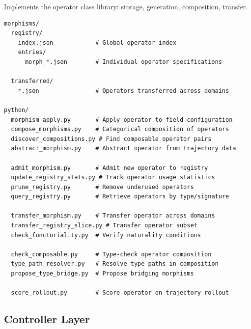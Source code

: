 \documentclass[11pt, oneside]{article}
\begin{document}
Implements the operator class library: storage, generation, composition, transfer.
\begin{verbatim}
morphisms/
  registry/
    index.json            # Global operator index
    entries/
      morph_*.json        # Individual operator specifications

  transferred/
    *.json                # Operators transferred across domains

python/
  morphism_apply.py       # Apply operator to field configuration
  compose_morphisms.py    # Categorical composition of operators
  discover_compositions.py # Find composable operator pairs
  abstract_morphism.py    # Abstract operator from trajectory data

  admit_morphism.py       # Admit new operator to registry
  update_registry_stats.py # Track operator usage statistics
  prune_registry.py       # Remove underused operators
  query_registry.py       # Retrieve operators by type/signature

  transfer_morphism.py    # Transfer operator across domains
  transfer_registry_slice.py # Transfer operator subset
  check_functoriality.py  # Verify naturality conditions

  check_composable.py     # Type-check operator composition
  type_path_resolver.py   # Resolve type paths in composition
  propose_type_bridge.py  # Propose bridging morphisms

  score_rollout.py        # Score operator on trajectory rollout
\end{verbatim}

\subsection{Controller Layer}
\end{document}
